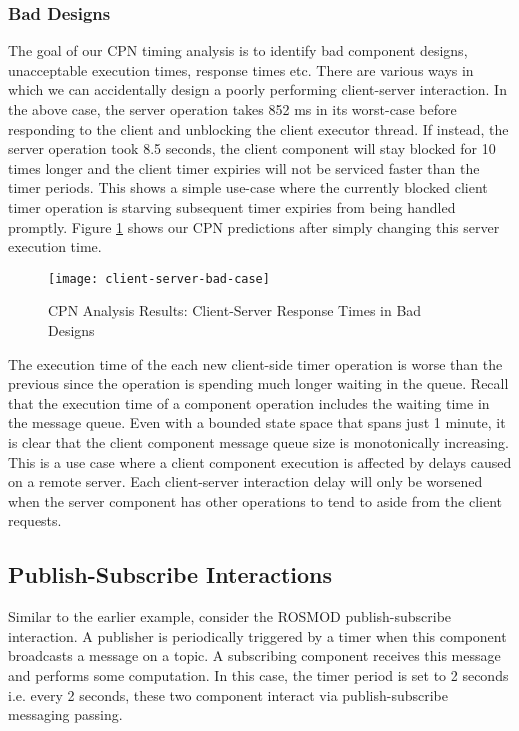 \subsubsection{Bad Designs}

The goal of our CPN timing analysis is to identify bad component designs, unacceptable execution times, response times etc. There are various ways in which we can accidentally design a poorly performing client-server interaction. In the above case, the server operation takes 852 ms in its worst-case before responding to the client and unblocking the client executor thread. If instead, the server operation took 8.5 seconds, the client component will stay blocked for 10 times longer and the client timer expiries will not be serviced faster than the timer periods. This shows a simple use-case where the currently blocked client timer operation is starving subsequent timer expiries from being handled promptly. Figure \ref{fig:client-server-bad-case} shows our CPN predictions after simply changing this server execution time. 

\begin{figure}[h]
	\centering
	\texttt{[image: client-server-bad-case]}
	\caption{CPN Analysis Results: Client-Server Response Times in Bad Designs}
	\label{fig:client-server-bad-case}
\end{figure}
\FloatBarrier

The execution time of the each new client-side timer operation is worse than the previous since the operation is spending much longer waiting in the queue. Recall that the execution time of a component operation includes the waiting time in the message queue. Even with a bounded state space that spans just 1 minute, it is clear that the client component message queue size is monotonically increasing. This is a use case where a client component execution is affected by delays caused on a remote server. Each client-server interaction delay will only be worsened when the server component has other operations to tend to aside from the client requests. 

\subsection{Publish-Subscribe Interactions}

Similar to the earlier example, consider the ROSMOD publish-subscribe interaction. A publisher is periodically triggered by a timer when this component broadcasts a message on a topic. A subscribing component receives this message and performs some computation. In this case, the timer period is set to 2 seconds i.e. every 2 seconds, these two component interact via publish-subscribe messaging passing. 

